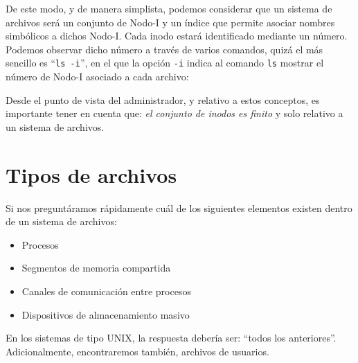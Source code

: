 \documentclass[12pt]{article}
\begin{document}
De este modo, y de manera simplista, podemos considerar que un sistema de 
archivos será un conjunto de Nodo-I y un índice que permite asociar nombres
simbólicos a dichos Nodo-I. Cada inodo estará identificado mediante un número.
Podemos observar dicho número a través de varios comandos, quizá el más 
sencillo es ``\texttt{ls -i}'', en el que la opción {\tt -i} indica al 
comando {\tt ls} mostrar el número de Nodo-I asociado a cada archivo: 




Desde el punto de vista del administrador, y relativo a estos conceptos, es
importante tener en cuenta que: \textit{el conjunto de inodos es finito} y 
solo relativo a un sistema de archivos. 

\section*{Tipos de archivos}
Si nos preguntáramos rápidamente cuál de los siguientes elementos existen 
dentro de un sistema de archivos: 
\begin{itemize}
\item Procesos 
\item Segmentos de memoria compartida
\item Canales de comunicación entre procesos
\item Dispositivos de almacenamiento masivo 
\end{itemize}

En los sistemas de tipo UNIX, la respuesta debería ser: ``todos los 
anteriores''. Adicionalmente, encontraremos también, archivos de usuarios. 
\end{document}
